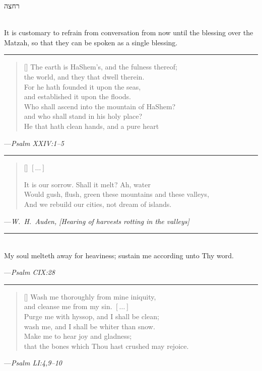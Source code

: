 \documentclass[a4paper,10pt,openany]{memoir}
\newcommand{\HgEllipsis}{\ensuremath{\left[\ldots\right]}}
\newcommand{\HgSource}[1]{\hfill{\small---\itshape{#1}}}
\newcommand{\hchapter}[1]{
  \begin{hebrew}
    \begin{Spacing}{.97}
      \newpage
      \strut

      \vspace{.15em}

      \noindent\Huge #1

      \vspace{1em}
    \end{Spacing}
  \end{hebrew}
}
\newcommand{\HgFill}{\vfill \hrule \vfill}
\newenvironment{HgEnglish}{\strut\\\noindent}{\vspace{1em}}
\newcommand{\JSrc}{\textsuperscript{\upshape{[J]}}}
\newcommand{\SSrc}{\textsuperscript{\upshape{[S]}}}
\begin{document}
\vfill

\hchapter{רחצה}

\begin{HgEnglish}
It is customary to refrain from conversation from now until the blessing over
the Matzah, so that they can be spoken as a single blessing.
\end{HgEnglish}

\HgFill

\settowidth{\versewidth}{\vin Who shall ascend into the mountain of HaShem?}
\begin{verse}[\versewidth]
  The earth is HaShem's, and the fulness thereof; \\
  \vin the world, and they that dwell therein. \\
  For he hath founded it upon the seas, \\
  \vin and established it upon the floods. \\
  Who shall ascend into the mountain of HaShem? \\
  \vin and who shall stand in his holy place? \\
  He that hath clean hands, and a pure heart \\
\end{verse}
\HgSource{Psalm XXIV:1--5 \JSrc}

\HgFill

\settowidth{\versewidth}{Would gush, flush, green these mountains and these
valleys}
\begin{verse}[\versewidth]
  \HgEllipsis

  It is our sorrow. Shall it melt? Ah, water \\
  Would gush, flush, green these mountains and these valleys, \\
  And we rebuild our cities, not dream of islands.
\end{verse}

\HgSource{W.~H.~Auden, [Hearing of harvests rotting in the valleys]}

\HgFill

\begin{HgEnglish}
  My soul melteth away for heaviness; sustain me according unto Thy word.

  \HgSource{Psalm CIX:28 \SSrc}
\end{HgEnglish}

\HgFill

\settowidth{\versewidth}{\vin that the bones which Thou hast crushed may
rejoice}
\begin{verse}[\versewidth]
  Wash me thoroughly from mine iniquity, \\
  \vin and cleanse me from my sin. \HgEllipsis \\
  Purge me with hyssop, and I shall be clean; \\
  \vin wash me, and I shall be whiter than snow. \\
  Make me to hear joy and gladness; \\
  \vin that the bones which Thou hast crushed may rejoice.
\end{verse}
\HgSource{Psalm LI:4,9--10 \SSrc}
\end{document}
